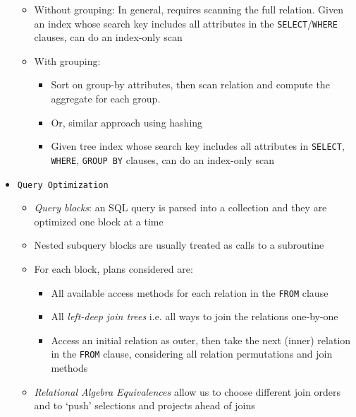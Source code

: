 \documentclass[landscape,8pt]{extarticle}
\newcommand{\code}{\lstinline}
\begin{document}
\begin{multicols}{5}
\begin{itemize}
              \begin{itemize}
                  \item Without grouping: In general, requires scanning the full relation. Given an index whose search key includes all attributes in the \code{SELECT}/\code{WHERE} clauses, can do an index-only scan
                  \item With grouping:
                        \begin{itemize}
                            \item Sort on group-by attributes, then scan relation and compute the aggregate for each group.
                            \item Or, similar approach using hashing
                            \item Given tree index whose search key includes all attributes in \code{SELECT}, \code{WHERE}, \code{GROUP BY} clauses, can do an index-only scan
                        \end{itemize}
              \end{itemize}
        \item \code{Query Optimization}
              \begin{itemize}
                  \item \emph{Query blocks}: an SQL query is parsed into a collection and they are optimized one block at a time
                  \item Nested subquery blocks are usually treated as calls to a subroutine
                  \item For each block, plans considered are:
                        \begin{itemize}
                            \item All available access methods for each relation in the \code{FROM} clause
                            \item All \emph{left-deep join trees} i.e. all ways to join the relations one-by-one
                            \item Access an initial relation as outer, then take the next (inner) relation in the \code{FROM} clause, considering all relation permutations and join methods
                        \end{itemize}
                  \item \emph{Relational Algebra Equivalences} allow us to choose different join orders and to `push' selections and projects ahead of joins
                        \begin{itemize}

\end{itemize}
\end{itemize}
\end{itemize}
\end{multicols}
\end{document}
